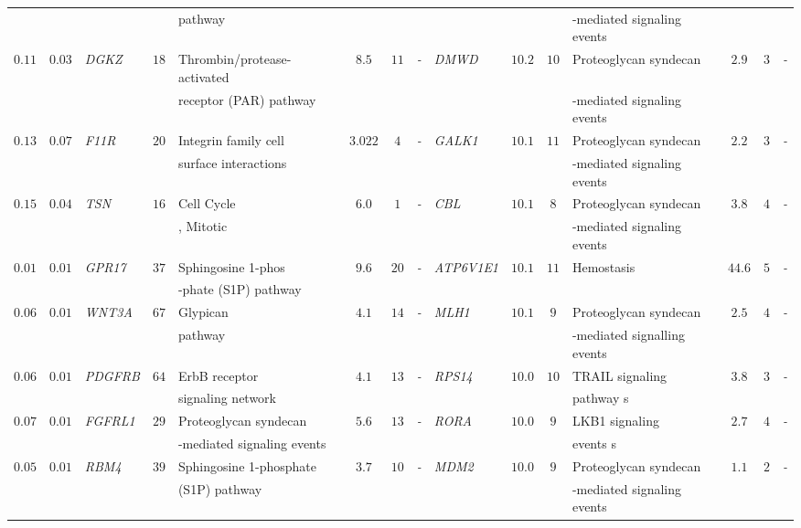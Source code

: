 \documentclass[10pt]{article}
\begin{document}
{\begin{landscape}
\begin{table}[!htbp]
{\begin{tabular}{c c l c l c c l |l c c l c c l}
&&&&  pathway &&&&&&&-mediated signaling events &&&\tabularnewline

$0.11$ & $0.03$ & \textit{DGKZ} & $18$ & Thrombin/protease-activated & $8.5$ & $11$&\textit{-} & \textit{DMWD} & $10.2$ & $10$ & Proteoglycan syndecan & $2.9$ & $3$ & \textit{-} \tabularnewline

&&&& receptor (PAR) pathway &&&&&&&-mediated signaling events &&&\tabularnewline
$0.13$ & $0.07$ & \textit{F11R} & $20$ & Integrin family cell & $3.022$ & $4$&\textit{-} & \textit{GALK1} & $10.1$ & $11$ & Proteoglycan syndecan & $2.2$ & $3$ & \textit{-} \tabularnewline

&&&& surface interactions &&&&&&&-mediated signaling events &&&\tabularnewline

$0.15$ & $0.04$ & \textit{TSN} & $16$ & Cell Cycle & $6.0$ & $1$&\textit{-} & \textit{CBL} & $10.1$ & $8$ & Proteoglycan syndecan & $3.8$ & $4$ & \textit{-} \tabularnewline

&&&& , Mitotic &&&&&&&-mediated signaling events &&&\tabularnewline

$0.01$ & $0.01$ & \textit{GPR17} & $37$ & Sphingosine 1-phos & $9.6$ & $20$&\textit{-} & \textit{ATP6V1E1} & $10.1$ & $11$ & Hemostasis & $44.6$ & $5$ & \textit{-} \tabularnewline

&&&& -phate (S1P) pathway &&&&&&& &&&\tabularnewline

$0.06$ & $0.01$ & \textit{WNT3A} & $67$ & Glypican & $4.1$ & $14$&\textit{-} & \textit{MLH1} & $10.1$ & $9$ & Proteoglycan syndecan & $2.5$ & $4$ & \textit{-} \tabularnewline

&&&& pathway &&&&&&& -mediated signalling events&&&\tabularnewline

$0.06$ & $0.01$ & \textit{PDGFRB} & $64$ & ErbB receptor  & $4.1$ & $13$&\textit{-} & \textit{RPS14} & $10.0$ & $10$ & TRAIL signaling & $3.8$ & $3$ & \textit{-} \tabularnewline
&&&& signaling network &&&&&&& pathway s&&&\tabularnewline

$0.07$ & $0.01$ & \textit{FGFRL1} & $29$ & Proteoglycan syndecan & $5.6$ & $13$&\textit{-} & \textit{RORA} & $10.0$ & $9$ & LKB1 signaling & $2.7$ & $4$ & \textit{-} \tabularnewline

&&&& -mediated signaling events &&&&&&&  events s&&&\tabularnewline

$0.05$ & $0.01$ & \textit{RBM4} & $39$ & Sphingosine 1-phosphate & $3.7$ & $10$&\textit{-} & \textit{MDM2} & $10.0$ & $9$ & Proteoglycan syndecan & $1.1$ & $2$ & \textit{-} \tabularnewline
&&&&  (S1P) pathway  &&&&&&& -mediated signaling events &&&\tabularnewline


\end{tabular}}
\end{table}
\end{landscape}}
\end{document}
